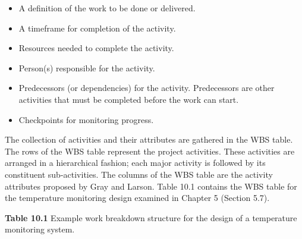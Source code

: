\begin{itemize}
\item
  A definition of the work to be done or delivered.
\item
  A timeframe for completion of the activity.
\item
  Resources needed to complete the activity.
\item
  Person(s) responsible for the activity.
\item
  Predecessors (or dependencies) for the activity. Predecessors are
  other activities that must be completed before the work can start.
\item
  Checkpoints for monitoring progress.
\end{itemize}

The collection of activities and their attributes are gathered in the
WBS table. The rows of the WBS table represent the project activities.
These activities are arranged in a hierarchical fashion; each major
activity is followed by its constituent sub-activities. The columns of
the WBS table are the activity attributes proposed by Gray and Larson.
Table 10.1 contains the WBS table for the temperature monitoring design
examined in Chapter 5 (Section 5.7).

\textbf{Table 10.1} Example work breakdown structure for the design of a
temperature monitoring system.

